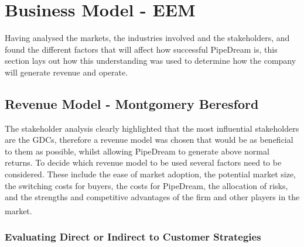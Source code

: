 \documentclass[11pt]{article}		%
\newcommand{\supercite}[1]{\textsuperscript{\cite{#1}}}		%
\begin{document}
	\section{Business Model - EEM}\label{businessmodel}
	  
	 Having analysed the markets, the industries involved and the stakeholders, and found the different factors that will affect how successful PipeDream is, this section lays out how this understanding was used to determine how the company will generate revenue and operate.      
    
		\subsection[Revenue Model]{Revenue Model - Montgomery Beresford}
		
     The stakeholder analysis clearly highlighted that the most influential stakeholders are the GDCs, therefore a revenue model was chosen that would be as beneficial to them as possible, whilst allowing PipeDream to generate above normal returns. To decide which revenue model to be used several factors need to be considered. These include the ease of market adoption, the potential market size,  the switching costs for buyers, the costs for PipeDream, the allocation of risks, and the strengths and competitive advantages of the firm and other players in the market\supercite{Daniel}.
           
    \subsubsection{Evaluating Direct or Indirect to Customer Strategies}
    
\end{document}
